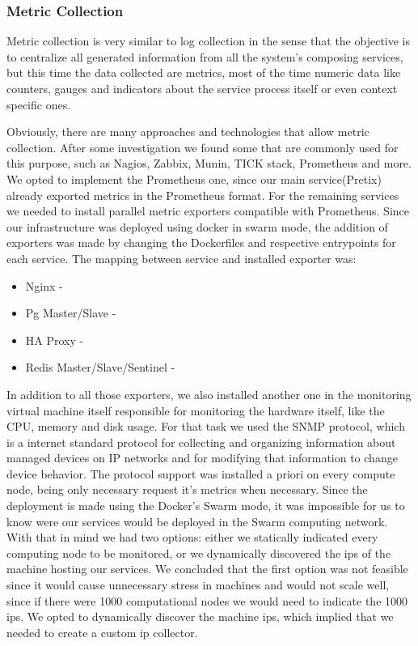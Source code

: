 \documentclass[12pt]{article}
\begin{document}
\subsubsection{Metric Collection}
Metric collection is very similar to log collection in the sense that the objective is to centralize all generated information from all the system's composing services, but this time the data collected are metrics, most of the time numeric data like counters, gauges and indicators about the service process itself or even context specific ones.

Obviously, there are many approaches and technologies that allow metric collection. After some investigation we found some that are commonly used for this purpose, such as Nagios, Zabbix, Munin, TICK stack, Prometheus and more. We opted to implement the Prometheus one, since our main service(Pretix) already exported metrics in the Prometheus format. For the remaining services we needed to install parallel metric exporters compatible with Prometheus. Since our infrastructure was deployed using docker in swarm mode, the addition of exporters was made by changing the Dockerfiles and respective entrypoints for each service. The mapping between service and installed exporter was:

\begin{itemize}
  \item Nginx -
  \item Pg Master/Slave -
  \item HA Proxy -
  \item Redis Master/Slave/Sentinel -
\end{itemize}

In addition to all those exporters, we also installed another one in the monitoring virtual machine itself responsible for monitoring the hardware itself, like the CPU, memory and disk usage. For that task we used the SNMP protocol, which is a internet standard protocol for collecting and organizing information about managed devices on IP networks and for modifying that information to change device behavior. The protocol support was installed a priori on every compute node, being only necessary request it's metrics when necessary. Since the deployment is made using the Docker's Swarm mode, it was impossible for us to know were our services would be deployed in the Swarm computing network. With that in mind we had two options: either we statically indicated every computing node to be monitored, or we dynamically discovered the ips of the machine hosting our services. We concluded that the first option was not feasible since it would cause unnecessary stress in machines and would not scale well, since if there were 1000 computational nodes we would need to indicate the 1000 ips. We opted to dynamically discover the machine ips, which implied that we needed to create a custom ip collector.
\end{document}
